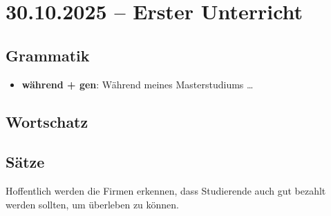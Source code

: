 \section{30.10.2025 -- Erster Unterricht}

\subsection{Grammatik}

\begin{itemize}
    \item \textbf{während + gen}: Während meines Masterstudiums \dots
\end{itemize}

\subsection{Wortschatz}

\begin{vocabtable}
\end{vocabtable}

\subsection{Sätze}

Hoffentlich werden die Firmen erkennen, dass Studierende auch gut bezahlt werden sollten, um überleben zu können.
